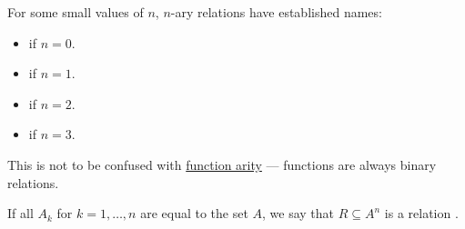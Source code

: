 \begin{definition}
\begin{thmenum}[series=def:relation]
     For some small values of \( n \), \( n \)-ary relations have established names:
    \begin{itemize}
      \item {} if \( n = 0 \).
      \item {} if \( n = 1 \).
      \item {} if \( n = 2 \).
      \item {} if \( n = 3 \).
    \end{itemize}

    This is not to be confused with \hyperref[def:function_arity]{function arity} --- functions are always binary relations.

     If all \( A_k \) for \( k = 1, \ldots, n \) are equal to the set \( A \), we say that \( R \subseteq A^n \) is a relation .
  \end{thmenum}
\end{definition}


